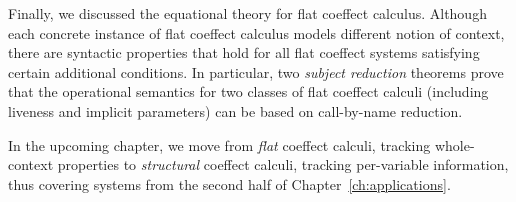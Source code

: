 Finally, we discussed the equational theory for flat coeffect calculus. Although each 
concrete instance of flat coeffect calculus models different notion of context, there are
syntactic properties that hold for all flat coeffect systems satisfying certain additional
conditions. In particular, two \emph{subject reduction} theorems prove that the operational
semantics for two classes of flat coeffect calculi (including liveness and implicit parameters) 
can be based on call-by-name reduction.

In the upcoming chapter, we move from \emph{flat} coeffect calculi, tracking whole-context
properties to \emph{structural} coeffect calculi, tracking per-variable information, thus
covering systems from the second half of Chapter~\ref{ch:applications}.